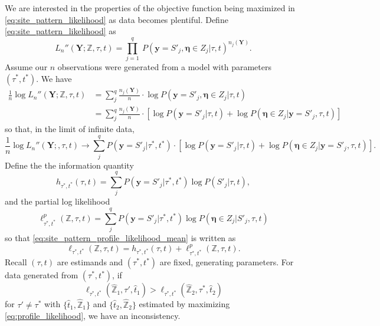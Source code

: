 \documentclass[a4paper]{article}
\newcommand{\fullAlignment}{\mathbf{Y}}
\newcommand{\alignmentColumn}{\mathbf{y}}
\newcommand{\siteSplit}{S'}
\newcommand{\ancestralStateColumn}{\boldsymbol\eta}
\newcommand{\ancestralStateCategory}{Z}
\newcommand{\fullAncestralStateCategories}{\mathbb{Z}}
\newcommand{\nCols}{n}
\newcommand{\nSiteSplits}{q}
\begin{document}
We are interested in the properties of the objective function being maximized in \eqref{eq:site_pattern_likelihood} as data becomes plentiful.
Define \eqref{eq:site_pattern_likelihood} as
$$
L_\nCols''(\fullAlignment;\fullAncestralStateCategories,\tau,t) = \prod_{j=1}^{\nSiteSplits} \ P(\alignmentColumn=\siteSplit_j, \ancestralStateColumn\in\ancestralStateCategory_j | \tau, t)^{\nCols_j(\fullAlignment)} .
$$
Assume our $\nCols$ observations were generated from a model with parameters $(\tau^*, t^*)$.
We have
\begin{align}
    \frac{1}{\nCols} \log L_\nCols''(\fullAlignment;\fullAncestralStateCategories,\tau,t)
        &= \sum_{j}^\nSiteSplits \frac{\nCols_j(\fullAlignment)}{\nCols}\cdot  \log P(\alignmentColumn=\siteSplit_j, \ancestralStateColumn\in\ancestralStateCategory_j | \tau, t) \\
        &= \sum_{j}^\nSiteSplits \frac{\nCols_j(\fullAlignment)}{\nCols}\cdot [\log P(\alignmentColumn=\siteSplit_j | \tau, t) + 
            \log P(\ancestralStateColumn\in\ancestralStateCategory_j | \alignmentColumn=\siteSplit_j , \tau, t)]
\end{align}
so that, in the limit of infinite data,
\begin{equation}
\frac{1}{\nCols} \log L_\nCols''(\fullAlignment;,\tau,t) \rightarrow \sum_{j}^\nSiteSplits P(\alignmentColumn=\siteSplit_j | \tau^*, t^*) \cdot [\log P(\alignmentColumn=\siteSplit_j | \tau, t) + \log P(\ancestralStateColumn\in\ancestralStateCategory_j | \alignmentColumn=\siteSplit_j , \tau, t)]. \label{eq:site_pattern_profile_likelihood_mean}
\end{equation}
Define the the information quantity
$$
h_{\tau^*,t^*}(\tau,t) = \sum_{j}^\nSiteSplits P(\alignmentColumn=\siteSplit_j | \tau^*, t^*) \log P(\siteSplit_j | \tau, t),
$$
and the partial log likelihood
$$
\ell^p_{\tau^*,t^*}(\fullAncestralStateCategories,\tau,t) = \sum_{j}^\nSiteSplits P(\alignmentColumn=\siteSplit_j | \tau^*, t^*) \log P(\ancestralStateColumn\in\ancestralStateCategory_j | \siteSplit_j, \tau, t)
$$
so that \eqref{eq:site_pattern_profile_likelihood_mean} is written as
\begin{equation}
    \label{eq:log_likelihood_simplified}
\ell_{\tau^*,t^*}(\fullAncestralStateCategories,\tau,t) = h_{\tau^*,t^*}(\tau,t) + \ell^p_{\tau^*,t^*}(\fullAncestralStateCategories,\tau,t).
\end{equation}
Recall $(\tau, t)$ are estimands and $(\tau^*, t^*)$ are fixed, generating parameters.
For data generated from $(\tau^*, t^*)$, if
\begin{equation}
\label{eq:inconsistency_inequality}
\ell_{\tau^*,t^*}(\hat{\fullAncestralStateCategories}_1,\tau',\hat{t}_1) > \ell_{\tau^*,t^*}(\hat{\fullAncestralStateCategories}_2,\tau^*,\hat{t}_2)
\end{equation}
for $\tau'\neq\tau^*$ with $\{\hat{t}_1,\hat{\fullAncestralStateCategories}_1\}$ and $\{\hat{t}_2,\hat{\fullAncestralStateCategories}_2\}$ estimated by maximizing \eqref{eq:profile_likelihood}, we have an inconsistency.
\end{document}
